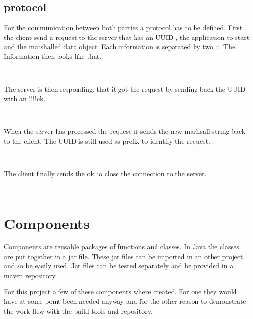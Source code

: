 \documentclass[paper=a4,twoside=false,BCOR=0mm,DIV=calc,fontsize=12pt]{scrartcl}
\begin{document}
\subsection{protocol}
For the communication between both parties a protocol has to be defined. 
First the client send a request to the server that has an UUID \cite{uuid}, the application to start and the marshalled data object.
Each information is separated by two ::. The Information then looks like that.
\begin{verbatim}
 
\end{verbatim}

The server is then responding, that it got the request by sending back the UUID with an !!!!ok.
\begin{verbatim}
 
\end{verbatim}

When the server has processed the request it sends the new marhsall string back to the client. The UUID is still used as prefix to identify the request.
\begin{verbatim}
 
\end{verbatim}

The client finally sends the ok to close the connection to the server.
\begin{verbatim}
 
\end{verbatim}



\section{Components}
Components are reusable packages of functions and classes. In Java the classes are put together in a jar file. These jar files can be imported in an other project and so be easily used.
Jar files can be tested separately and be provided in a maven repository.

For this project a few of these components where created. For one they would have at some point been needed anyway and for the other reason to
demonstrate the work flow with the build tools and repository.
\end{document}
